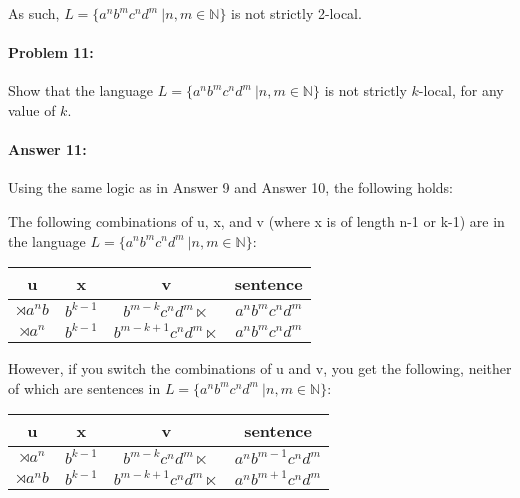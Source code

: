 \documentclass[10pt]{article}
\begin{document}
\noindent As such, $L= \{a^n b^m c^n d^m\ | n, m \in \mathbb{N} \}$ is not strictly 2-local.

\hrulefill
\paragraph{Problem 11:}

Show that the language $L= \{a^n b^m c^n d^m\ | n, m \in \mathbb{N} \}$ is not
strictly $k$-local, for any value of $k$.

\paragraph{Answer 11:} Using the same logic as in Answer 9 and Answer 10, the following holds:

\noindent The following combinations of u, x, and v (where x is of length n-1 or k-1) are in the language $L= \{a^n b^m c^n d^m\ | n, m \in \mathbb{N} \}$:

\begin{center}
    \begin{tabular}{| c | c | c | c |}
        \hline
         \textbf{u} & \textbf{x} & \textbf{v} & \textbf{sentence}\\
         \hline
         $\rtimes a^n b$ & $b^{k-1}$ & $b^{m-k} c^n d^m \ltimes$ & $a^nb^mc^nd^m$\\
         \hline 
         $\rtimes a^n$ & $b^{k-1}$ & $b^{m-k+1} c^n d^m \ltimes$ & $a^nb^mc^nd^m$\\
         \hline
    \end{tabular}
\end{center}

\noindent However, if you switch the combinations of u and v, you get the following, neither of which are sentences in $L= \{a^n b^m c^n d^m\ | n, m \in \mathbb{N} \}$:

\begin{center}
    \begin{tabular}{| c | c | c | c |}
        \hline
         \textbf{u} & \textbf{x} & \textbf{v} & \textbf{sentence}\\
         \hline
         $\rtimes a^n$ & $b^{k-1}$ & $b^{m-k} c^n d^m \ltimes$ & $a^nb^{m-1}c^nd^m$\\
         \hline 
         $\rtimes a^n b$ & $b^{k-1}$ & $b^{m-k+1} c^n d^m \ltimes$ & $a^nb^{m+1}c^nd^m$\\
         \hline
    \end{tabular}
\end{center}
\end{document}
